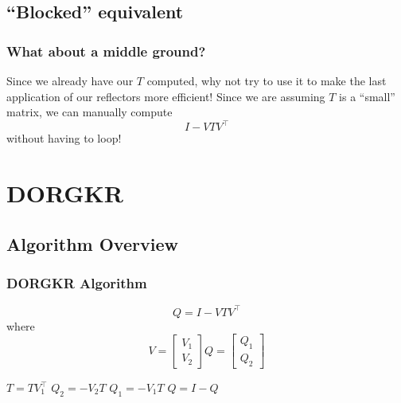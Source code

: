 \documentclass[12pt,aspectratio=169]{beamer}
\begin{document}
    \subsection{``Blocked'' equivalent}
    \begin{frame}
        \frametitle{What about a middle ground?}
        Since we already have our $T$ computed, why not try to use it to make the last application of our reflectors
        more efficient! Since we are assuming $T$ is a ``small'' matrix, we can manually compute 
        $$
            I - VTV^\top
        $$
        without having to loop!
    \end{frame}
    \section{DORGKR}
    \subsection{Algorithm Overview}
    \begin{frame}
        \frametitle{DORGKR Algorithm}
        $$
            Q = I - VTV^\top
        $$ where
        $$
        V = \begin{bmatrix} V_1 \\ V_2 \end{bmatrix}
        Q = \begin{bmatrix} Q_1 \\ Q_2 \end{bmatrix}
        $$
        \begin{algorithmic}[1]
            \State $T = TV_1^\top$
            \State $Q_2 = -V_2T$
            \State $Q_1 = -V_1T$
            \State $Q = I - Q$
        \end{algorithmic}
    \end{frame}
\end{document}
